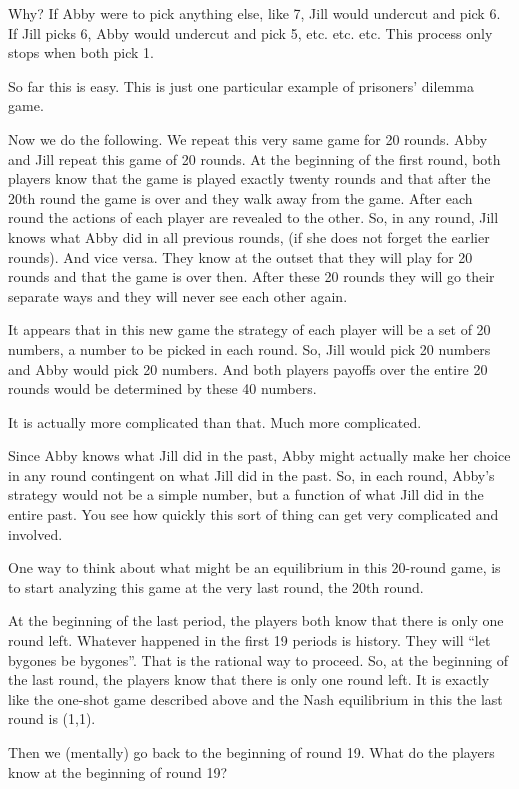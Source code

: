 \documentclass[
]{book}
\begin{document}
Why? If Abby were to pick anything else, like 7, Jill would undercut and pick 6. If Jill picks 6, Abby would undercut and pick 5, etc. etc. etc. This process only stops when both pick 1.

So far this is easy. This is just one particular example of prisoners' dilemma game.

Now we do the following. We repeat this very same game for 20 rounds. Abby and Jill repeat this game of 20 rounds. At the beginning of the first round, both players know that the game is played exactly twenty rounds and that after the 20th round the game is over and they walk away from the game. After each round the actions of each player are revealed to the other. So, in any round, Jill knows what Abby did in all previous rounds, (if she does not forget the earlier rounds). And vice versa. They know at the outset that they will play for 20 rounds and that the game is over then. After these 20 rounds they will go their separate ways and they will never see each other again.

It appears that in this new game the strategy of each player will be a set of 20 numbers, a number to be picked in each round. So, Jill would pick 20 numbers and Abby would pick 20 numbers. And both players payoffs over the entire 20 rounds would be determined by these 40 numbers.

It is actually more complicated than that. Much more complicated.

Since Abby knows what Jill did in the past, Abby might actually make her choice in any round contingent on what Jill did in the past. So, in each round, Abby's strategy would not be a simple number, but a function of what Jill did in the entire past. You see how quickly this sort of thing can get very complicated and involved.

One way to think about what might be an equilibrium in this 20-round game, is to start analyzing this game at the very last round, the 20th round.

At the beginning of the last period, the players both know that there is only one round left. Whatever happened in the first 19 periods is history. They will ``let bygones be bygones''. That is the rational way to proceed. So, at the beginning of the last round, the players know that there is only one round left. It is exactly like the one-shot game described above and the Nash equilibrium in this the last round is (1,1).

Then we (mentally) go back to the beginning of round 19. What do the players know at the beginning of round 19?
\end{document}
